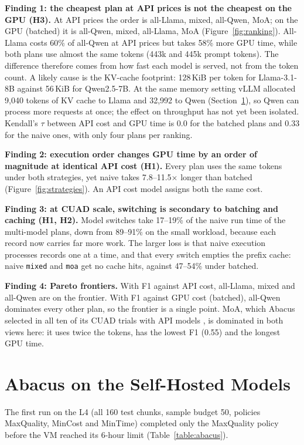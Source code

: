 \documentclass[a4paper,12pt]{report}
\newcommand{\code}[1]{\texttt{#1}}
\begin{document}
\textbf{Finding 1: the cheapest plan at API prices is not the cheapest on the GPU (H3).} At API
prices the order is all-Llama, mixed, all-Qwen, MoA; on the GPU (batched) it is all-Qwen, mixed,
all-Llama, MoA (Figure~\ref{fig:ranking}). All-Llama costs 60\% of all-Qwen at API prices but takes
58\% more GPU time, while both plans use almost the same tokens (443k and 445k prompt tokens). The
difference therefore comes from how fast each model is served, not from the token count. A likely
cause is the KV-cache footprint: 128\,KiB per token for Llama-3.1-8B against 56\,KiB for Qwen2.5-7B.
At the same memory setting vLLM allocated 9,040 tokens of KV cache to Llama and 32,992 to Qwen
(Section~\ref{sec:abacusres}), so Qwen can process more requests at once; the effect on throughput
has not yet been isolated. Kendall's $\tau$ between API cost and GPU time is 0.0 for the batched
plans and 0.33 for the naive ones, with only four plans per ranking.

\textbf{Finding 2: execution order changes GPU time by an order of magnitude at identical API cost
(H1).} Every plan uses the same tokens under both strategies, yet naive takes 7.8--11.5$\times$
longer than batched (Figure~\ref{fig:strategies}). An API cost model assigns both the same cost.

\textbf{Finding 3: at CUAD scale, switching is secondary to batching and caching (H1, H2).} Model
switches take 17--19\% of the naive run time of the multi-model plans, down from 89--91\% on the small
workload, because each record now carries far more work. The larger loss is that naive execution
processes records one at a time, and that every switch empties the prefix cache: naive \code{mixed}
and \code{moa} get no cache hits, against 47--54\% under batched.

\textbf{Finding 4: Pareto frontiers.} With F1 against API cost, all-Llama, mixed and all-Qwen are on
the frontier. With F1 against GPU cost (batched), all-Qwen dominates every other plan, so the
frontier is a single point. MoA, which Abacus selected in all ten of its CUAD trials with API models
\cite{russo2025abacus}, is dominated in both views here: it uses twice the tokens, has the lowest F1
(0.55) and the longest GPU time.

\section{Abacus on the Self-Hosted Models}
\label{sec:abacusres}

The first run on the L4 (all 160 test chunks, sample budget 50, policies MaxQuality, MinCost and
MinTime) completed only the MaxQuality policy before the VM reached its 6-hour limit
(Table~\ref{table:abacus}).
\end{document}
